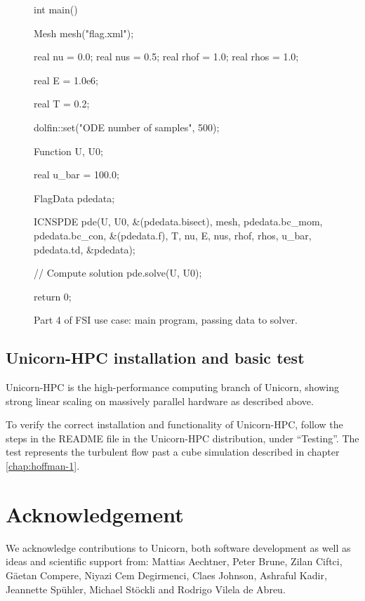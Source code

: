 \begin{figure}[!h]
\begin{c++}
int main()
{
  Mesh mesh("flag.xml");

  real nu = 0.0;
  real nus = 0.5;
  real rhof = 1.0;
  real rhos = 1.0;

  real E = 1.0e6;

  real T = 0.2;

  dolfin::set("ODE number of samples", 500);

  Function U, U0;

  real u_bar = 100.0;

  FlagData pdedata;

  ICNSPDE pde(U, U0, &(pdedata.bisect), mesh,
	      pdedata.bc_mom, pdedata.bc_con,
	      &(pdedata.f), T, nu, E, nus, rhof, rhos,
	      u_bar, pdedata.td, &pdedata);

  // Compute solution
  pde.solve(U, U0);

  return 0;
}
\end{c++}
\caption{Part 4 of FSI use case: main program, passing data to solver.}
\end{figure}

\subsection{Unicorn-HPC installation and basic test}

Unicorn-HPC is the high-performance computing branch of Unicorn,
showing strong linear scaling on massively parallel hardware as
described above.

To verify the correct installation and functionality of Unicorn-HPC,
follow the steps in the README file in the Unicorn-HPC distribution,
under ``Testing''. The test represents the turbulent flow past a cube
simulation described in chapter \ref{chap:hoffman-1}.

\section{Acknowledgement}

We acknowledge contributions to Unicorn, both software development as
well as ideas and scientific support from: Mattias Aechtner, Peter
Brune, Zilan Ciftci, G\"aetan Compere, Niyazi Cem Degirmenci, Claes
Johnson, Ashraful Kadir, Jeannette Sp\"uhler, Michael St\"ockli and
Rodrigo Vilela de Abreu.


